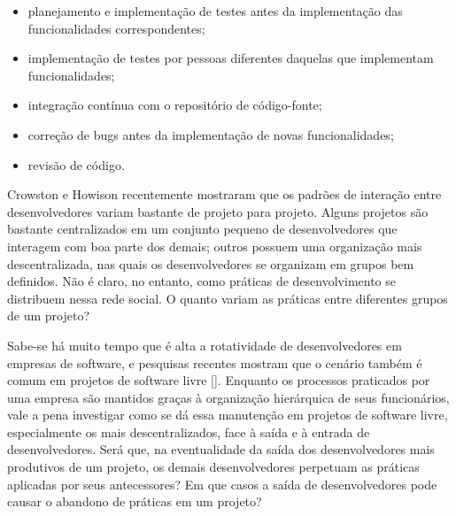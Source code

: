 \documentclass{article}
\begin{document}
\begin{itemize}
  \item planejamento e implementação de testes antes da implementação das
  funcionalidades correspondentes;
  \item implementação de testes por pessoas diferentes daquelas que
  implementam funcionalidades;
  \item integração contínua com o repositório de código-fonte;
  \item correção de bugs antes da implementação de novas funcionalidades;
  \item revisão de código.
\end{itemize}

Crowston e Howison \cite{crowston2005} recentemente mostraram que os padrões de
interação entre desenvolvedores variam bastante de projeto para projeto. Alguns
projetos são bastante centralizados em um conjunto pequeno de desenvolvedores
que interagem com boa parte dos demais; outros possuem uma organização mais
descentralizada, nas quais os desenvolvedores se organizam em grupos bem
definidos. Não é claro, no entanto, como práticas de desenvolvimento se
distribuem nessa rede social. O quanto variam as práticas entre diferentes
grupos de um projeto? 


Sabe-se há muito tempo que é alta a rotatividade de desenvolvedores em empresas
de software, e pesquisas recentes mostram que o cenário também é comum em
projetos de software livre []. Enquanto os processos praticados por uma empresa
são mantidos graças à organização hierárquica de seus funcionários, vale a pena
investigar como se dá essa manutenção em projetos de software livre,
especialmente os mais descentralizados, face à saída e à entrada de
desenvolvedores. Será que, na eventualidade da saída dos desenvolvedores mais
produtivos de um projeto, os demais desenvolvedores perpetuam as práticas
aplicadas por seus antecessores? Em que casos a saída de desenvolvedores pode
causar o abandono de práticas em um projeto?
\end{document}
